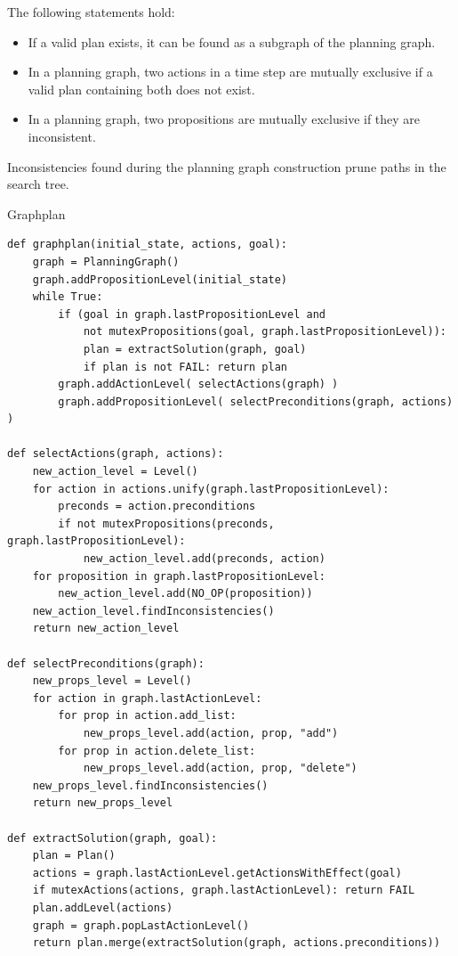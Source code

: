 \begin{theorem}
    The following statements hold:
    \begin{itemize}
        \item If a valid plan exists, it can be found as a subgraph of the planning graph.
        
        \item In a planning graph, two actions in a time step are mutually exclusive
            if a valid plan containing both does not exist.

        \item In a planning graph, two propositions are mutually exclusive if they are inconsistent.
    \end{itemize}
\end{theorem}

\begin{corollary}
    Inconsistencies found during the planning graph construction
    prune paths in the search tree.
\end{corollary}


\begin{algorithm}[H]
\caption{Graphplan}
\begin{lstlisting}[mathescape=true]
def graphplan(initial_state, actions, goal):
    graph = PlanningGraph()
    graph.addPropositionLevel(initial_state)
    while True:
        if (goal in graph.lastPropositionLevel and 
            not mutexPropositions(goal, graph.lastPropositionLevel)):
            plan = extractSolution(graph, goal)
            if plan is not FAIL: return plan
        graph.addActionLevel( selectActions(graph) )
        graph.addPropositionLevel( selectPreconditions(graph, actions) )

def selectActions(graph, actions):
    new_action_level = Level()
    for action in actions.unify(graph.lastPropositionLevel):
        preconds = action.preconditions
        if not mutexPropositions(preconds, graph.lastPropositionLevel):
            new_action_level.add(preconds, action)
    for proposition in graph.lastPropositionLevel:
        new_action_level.add(NO_OP(proposition))
    new_action_level.findInconsistencies()
    return new_action_level

def selectPreconditions(graph):
    new_props_level = Level()
    for action in graph.lastActionLevel:
        for prop in action.add_list:
            new_props_level.add(action, prop, "add")
        for prop in action.delete_list:
            new_props_level.add(action, prop, "delete")
    new_props_level.findInconsistencies()
    return new_props_level

def extractSolution(graph, goal):
    plan = Plan()
    actions = graph.lastActionLevel.getActionsWithEffect(goal)
    if mutexActions(actions, graph.lastActionLevel): return FAIL
    plan.addLevel(actions)
    graph = graph.popLastActionLevel()
    return plan.merge(extractSolution(graph, actions.preconditions))
\end{lstlisting}
\end{algorithm}


